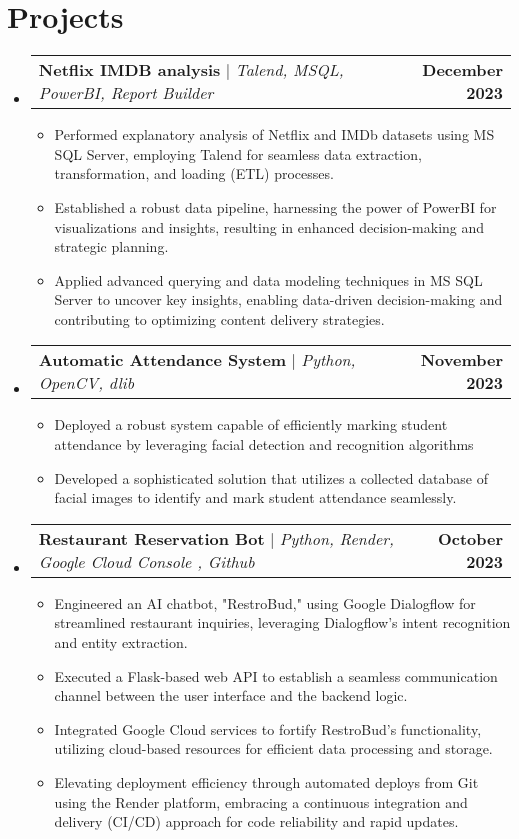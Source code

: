 \documentclass[letterpaper,11pt]{article}
\makeatletter
\newcommand{\resumeItem}[1]{
  \item\small{
    {#1 \vspace{-2pt}}
  }
}
\newcommand{\resumeProjectHeading}[2]{
    \item
    \begin{tabular*}{1.001\textwidth}{l@{\extracolsep{\fill}}r}
      \small#1 & \textbf{\small #2}\\
    \end{tabular*}\vspace{-7pt}
}
\newcommand{\resumeSubHeadingListStart}{\begin{itemize}[leftmargin=0.0in, label={}]}
\newcommand{\resumeSubHeadingListEnd}{\end{itemize}}
\newcommand{\resumeItemListStart}{\begin{itemize}}
\newcommand{\resumeItemListEnd}{\end{itemize}\vspace{-5pt}}
\makeatother
\begin{document}
\section{Projects}
    \vspace{-5pt}
    \resumeSubHeadingListStart
      \resumeProjectHeading
          {\textbf{Netflix IMDB analysis} $|$ \emph{Talend, MSQL, PowerBI, Report Builder}}{December 2023}
          \resumeItemListStart
            \resumeItem{Performed explanatory analysis of Netflix and IMDb datasets using MS SQL Server, employing Talend for seamless data extraction, transformation, and loading (ETL) processes.}
            \resumeItem{Established a robust data pipeline, harnessing the power of PowerBI for visualizations and insights, resulting in enhanced decision-making and strategic planning.}
            \resumeItem{Applied advanced querying and data modeling techniques in MS SQL Server to uncover key insights, enabling data-driven decision-making and contributing to optimizing content delivery strategies.}
          \resumeItemListEnd 
          \vspace{-13pt}
      \resumeProjectHeading
          {\textbf{Automatic Attendance System} $|$ \emph{Python, OpenCV, dlib}}{November 2023}
          \resumeItemListStart
            \resumeItem{Deployed a robust system capable of efficiently marking student attendance by leveraging facial detection and recognition algorithms}
            \resumeItem{Developed a sophisticated solution that utilizes a collected database of facial images to identify and mark student attendance seamlessly.}
          \resumeItemListEnd 
          \vspace{-13pt}
      \resumeProjectHeading
          {\textbf{Restaurant Reservation Bot} $|$ \emph{Python, Render, Google Cloud Console , Github}}{October 2023}
          \resumeItemListStart
            \resumeItem{Engineered an AI chatbot, "RestroBud," using Google Dialogflow for streamlined restaurant inquiries, leveraging Dialogflow's intent recognition and entity extraction.}
            \resumeItem{Executed a Flask-based web API to establish a seamless communication channel between the user interface and the backend logic. }
            \resumeItem{Integrated Google Cloud services to fortify RestroBud's functionality, utilizing cloud-based resources for efficient data processing and storage.}
            \resumeItem{Elevating deployment efficiency through automated deploys from Git using the Render platform, embracing a continuous integration and delivery (CI/CD) approach for code reliability and rapid updates.}
          \resumeItemListEnd
    \resumeSubHeadingListEnd
\vspace{-15pt}
\end{document}

